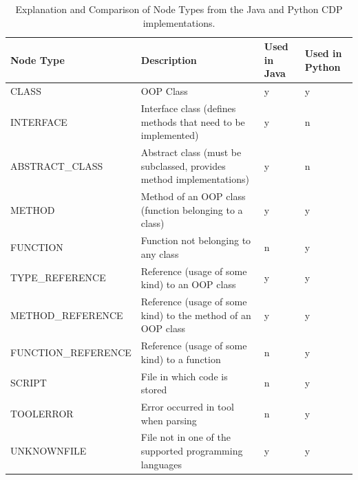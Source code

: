 \documentclass[a4paper,11pt,twoside]{article}
\theoremstyle{definition} %
\begin{document}
\begin{table}[h!]
\begin{center}
\begin{tabular}{m{4cm} | m{4.5cm} | m{2.4cm} | m{2.4cm}} 
 \hline
 \rowcolor{lightgray} Node Type & Description & Used in Java & Used in Python \\
 \hline
 CLASS & OOP Class & y & y \\
 \hline
 INTERFACE & Interface class (defines methods that need to be implemented) & y & n \\
 \hline
 ABSTRACT\_CLASS & Abstract class (must be subclassed, provides method implementations) & y & n \\
 \hline
 METHOD & Method of an OOP class (function belonging to a class) & y & y \\
 \hline
 FUNCTION & Function not belonging to any class & n & y \\
 \hline
 TYPE\_REFERENCE & Reference (usage of some kind) to an OOP class & y & y \\
 \hline
 METHOD\_REFERENCE & Reference (usage of some kind) to the method of an OOP class & y & y \\
 \hline
 FUNCTION\_REFERENCE & Reference (usage of some kind) to a function & n & y \\
 \hline
 SCRIPT & File in which code is stored & n & y \\
 \hline
 TOOLERROR & Error occurred in tool when parsing & n & y \\
 \hline
 UNKNOWNFILE  & File not in one of the supported programming languages & y & y \\
 \hline
\end{tabular}
\end{center}
\caption{Explanation and Comparison of Node Types from the Java and Python CDP implementations.}
\label{table:NodeTypeOverview}
\end{table}
\end{document}
